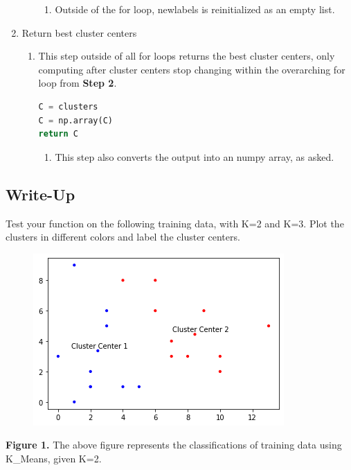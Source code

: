 \documentclass[11pt]{article}
\theoremstyle{definition}
\begin{document}
\begin{enumerate}
\begin{enumerate}
\begin{enumerate}
            \item Outside of the for loop, \textsf{newlabels} is reinitialized as an empty list.
        \end{enumerate}
    \end{enumerate}
    \item Return best cluster centers
    \begin{enumerate}
        \item This step outside of all for loops returns the best cluster centers, only computing after cluster centers stop changing within the overarching for loop from \textbf{Step 2}.
\begin{lstlisting}[language=python, frame=single]
C = clusters
C = np.array(C)
return C
\end{lstlisting}
        \begin{enumerate}
            \item This step also converts the output into an \textsf{numpy} array, as asked.
        \end{enumerate}
    \end{enumerate}
\end{enumerate}

\clearpage
\subsection{Write-Up}
\begin{shaded}
Test your function on the following training data, with K=2 and K=3. Plot the clusters in different colors and label the cluster centers.
\end{shaded}

\begin{figure}[hbt!]
 \centering
 \includegraphics[scale=0.90]{Clustering_plot1}
\end{figure}
\textbf{Figure 1.} The above figure represents the classifications of training data using \textsf{K\_Means}, given K=2. 
\end{document}
